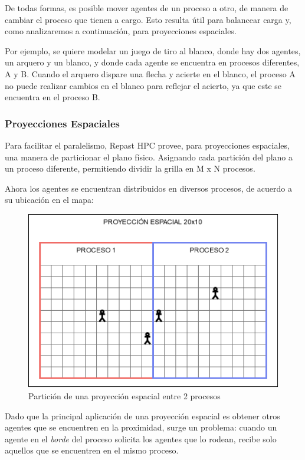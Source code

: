 De todas formas, es posible mover agentes de un proceso a otro, de
manera de cambiar el proceso que tienen a cargo. Esto resulta útil para
balancear carga y, como analizaremos a continuación, para proyecciones
espaciales.

Por ejemplo, se quiere modelar un juego de tiro al blanco, donde hay dos
agentes, un arquero y un blanco, y donde cada agente se encuentra en
procesos diferentes, A y B. Cuando el arquero dispare una flecha y
acierte en el blanco, el proceso A no puede realizar cambios en el
blanco para reflejar el acierto, ya que este se encuentra en el proceso
B.

\subsubsection{Proyecciones Espaciales}

Para facilitar el paralelismo, Repast HPC provee, para proyecciones
espaciales, una manera de particionar el plano físico. Asignando cada
partición del plano a un proceso diferente, permitiendo dividir la
grilla en M x N procesos.

Ahora los agentes se encuentran distribuidos en diversos procesos, de
acuerdo a su ubicación en el mapa:

\begin{figure}[H]
	\centering
	\includegraphics{process_01.png}
	\caption{Partición de una proyección espacial entre 2 procesos}
\end{figure}

Dado que la principal aplicación de una proyección espacial es obtener
otros agentes que se encuentren en la proximidad, surge un problema:
cuando un agente en el \emph{borde} del proceso solicita los agentes que
lo rodean, recibe solo aquellos que se encuentren en el mismo proceso.

